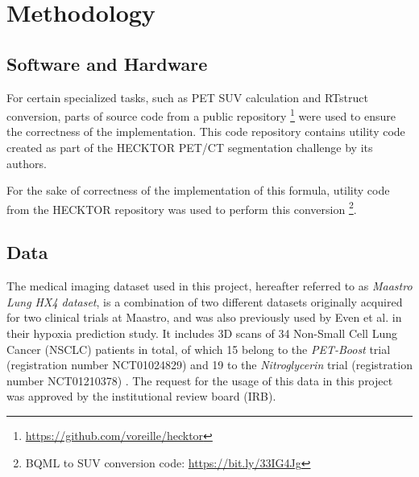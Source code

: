 \chapter{Methodology}
\label{Methodology}


\section{Software and Hardware}

For certain specialized tasks, such as PET SUV calculation and RTstruct conversion, parts of source code from a public repository \footnote{\url{https://github.com/voreille/hecktor}} were used to ensure the correctness of the implementation. This code repository contains utility code created as part of the HECKTOR PET/CT segmentation challenge \cite{andrearczyk2020overview} by its authors.

For the sake of correctness of the implementation of this formula, utility code from the HECKTOR repository was used to perform this conversion \footnote{BQML to SUV conversion code: \url{https://bit.ly/33IG4Jg}}.




\section{Data}
The medical imaging dataset used in this project, hereafter referred to as \textit{Maastro Lung HX4 dataset}, is a combination of two different datasets originally acquired for two clinical trials at Maastro, and was also previously used by Even et al. \cite{even2017predicting} in their hypoxia prediction study. It includes 3D scans of 34 Non-Small Cell Lung Cancer (NSCLC) patients in total, of which 15 belong to the \textit{PET-Boost} trial (registration number NCT01024829) \cite{van2012pet} and 19 to the \textit{Nitroglycerin} trial (registration number NCT01210378) \cite{even2017predicting}. The request for the usage of this data in this project was approved by the institutional review board (IRB).


